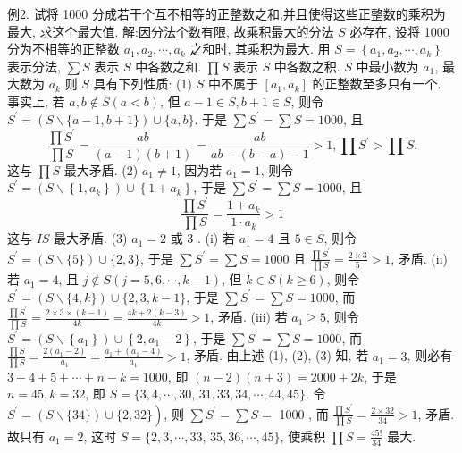 例2. 试将 1000 分成若干个互不相等的正整数之和,并且使得这些正整数的乘积为最大, 求这个最大值.
解:因分法个数有限, 故乘积最大的分法 $S$ 必存在, 设将 1000 分为不相等的正整数 $a_1, a_2, \cdots, a_k$ 之和时, 其乘积为最大.
用 $S=\left\{a_1, a_2, \cdots, a_k\right\}$ 表示分法, $\sum S$ 表示 $S$ 中各数之和.
$\prod S$ 表示 $S$ 中各数之积.
$S$ 中最小数为 $a_1$, 最大数为 $a_k$ 则 $S$ 具有下列性质:
(1) $S$ 中不属于 $\left[a_1, a_k\right]$ 的正整数至多只有一个.
事实上, 若 $a, b \notin S (a<b)$, 但 $a-1 \in S, b+1 \in S$, 则令 $S^{\prime}=(S \backslash\{a-1, b+1\}) \cup\{a, b\}$. 于是 $\sum S^{\prime}=\sum S=1000$, 且
$$
\frac{\prod S^{\prime}}{\prod S}=\frac{a b}{(a-1)(b+1)}=\frac{a b}{a b-(b-a)-1}>1, \prod S^{\prime}>\prod S .
$$
这与 $\prod S$ 最大矛盾.
(2) $a_1 \neq 1$, 因为若 $a_1=1$, 则令 $S^{\prime}=\left(S \backslash\left\{1, a_k\right\}\right) \cup\left\{1+a_k\right\}$, 于是 $\sum S^{\prime}=\sum S=1000$, 且
$$
\frac{\prod S^{\prime}}{\prod S}=\frac{1+a_k}{1 \cdot a_k}>1
$$
这与 $I S$ 最大矛盾.
(3) $a_1=2$ 或 3 .
(i) 若 $a_1=4$ 且 $5 \in S$, 则令 $S^{\prime}=(S \backslash\{5\}) \cup\{2,3\}$, 于是 $\sum S^{\prime}= \sum S=1000$ 且 $\frac{\prod S^{\prime}}{\prod S}=\frac{2 \times 3}{5}>1$, 矛盾.
(ii) 若 $a_1=4$, 且 $j \notin S(j=5,6, \cdots, k-1)$, 但 $k \in S(k \geqslant 6)$, 则令 $S^{\prime}=(S \backslash\{4, k\}) \cup\{2,3, k-1\}$, 于是 $\sum S^{\prime}=\sum S=1000$, 而 $\frac{\prod S^{\prime}}{\prod S}= \frac{2 \times 3 \times(k-1)}{4 k}=\frac{4 k+2(k-3)}{4 k}>1$, 矛盾.
(iii) 若 $a_1 \geqslant 5$, 则令 $S^{\prime}=\left(S \backslash\left\{a_1\right\}\right) \cup\left\{2, a_1-2\right\}$, 于是 $\sum S^{\prime}= \sum S=1000$, 而 $\frac{\prod S}{\prod S}=\frac{2\left(a_1-2\right)}{a_1}=\frac{a_1+\left(a_1-4\right)}{a_1}>1$, 矛盾.
由上述 (1), (2), (3) 知, 若 $a_1=3$, 则必有 $3+4+5+\cdots+n-k=1000$, 即 $(n-2)(n+3)=2000+2 k$, 于是 $n=45, k=32$, 即 $S=\{3,4, \cdots, 30$,
$31,33,34, \cdots, 44,45\}$. 令 $\left.S^{\prime}=(S \backslash\{34\}) \cup\{2,32\}\right)$, 则 $\sum S^{\prime}=\sum S=$ 1000 , 而 $\frac{\prod S^{\prime}}{\prod S}=\frac{2 \times 32}{34}>1$, 矛盾.
故只有 $a_1=2$, 这时 $S=\{2,3, \cdots, 33$, $35,36, \cdots, 45\}$, 使乘积 $\prod S=\frac{45 !}{34}$ 最大.



